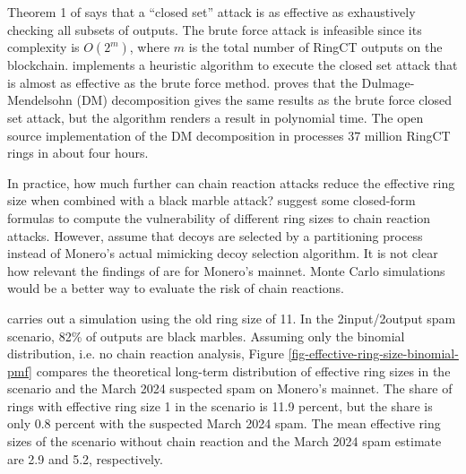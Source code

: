 \documentclass[usletter,11pt,english,openany]{article}
\begin{document}
Theorem 1 of \cite{Yu2019a} says that a ``closed set'' attack is
as effective as exhaustively checking all subsets of outputs. The
brute force attack is infeasible since its complexity is $O\left(2^{m}\right)$,
where $m$ is the total number of RingCT outputs on the blockchain.
\cite{Yu2019a} implements a heuristic algorithm to execute the closed
set attack that is almost as effective as the brute force method.
\cite{Vijayakumaran2023} proves that the Dulmage-Mendelsohn (DM)
decomposition gives the same results as the brute force closed set
attack, but the algorithm renders a result in polynomial time. The
open source implementation of the DM decomposition in \cite{Vijayakumaran2023}
processes 37 million RingCT rings in about four hours.

In practice, how much further can chain reaction attacks reduce the
effective ring size when combined with a black marble attack? \cite{Egger2022}
suggest some closed-form formulas to compute the vulnerability of
different ring sizes to chain reaction attacks. However, \cite{Egger2022}
assume that decoys are selected by a partitioning process instead
of Monero's actual mimicking decoy selection algorithm. It is not
clear how relevant the findings of \cite{Egger2022} are for Monero's
mainnet. Monte Carlo simulations would be a better way to evaluate
the risk of chain reactions.

\cite{Chervinski2021} carries out a simulation using the old ring
size of 11. In the 2input/2output spam scenario, 82\% of outputs are
black marbles. Assuming only the binomial distribution, i.e. no chain
reaction analysis, Figure \ref{fig-effective-ring-size-binomial-pmf}
compares the theoretical long-term distribution of effective ring
sizes in the \cite{Chervinski2021} scenario and the March 2024 suspected
spam on Monero's mainnet. The share of rings with effective ring size
1 in the \cite{Chervinski2021} scenario is 11.9 percent, but the
share is only 0.8 percent with the suspected March 2024 spam. The
mean effective ring sizes of the \cite{Chervinski2021} scenario without
chain reaction and the March 2024 spam estimate are 2.9 and 5.2, respectively.
\end{document}
